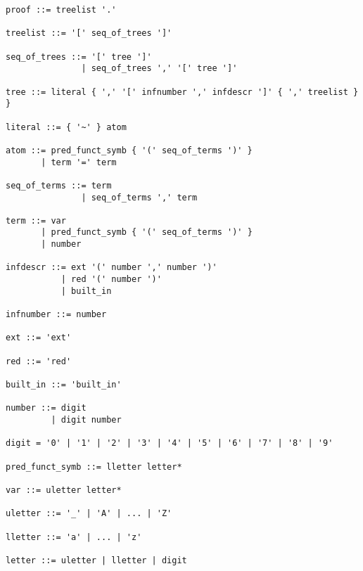 \begin{verbatim}
proof ::= treelist '.'

treelist ::= '[' seq_of_trees ']'

seq_of_trees ::= '[' tree ']'
               | seq_of_trees ',' '[' tree ']'

tree ::= literal { ',' '[' infnumber ',' infdescr ']' { ',' treelist } }

literal ::= { '~' } atom

atom ::= pred_funct_symb { '(' seq_of_terms ')' }
       | term '=' term

seq_of_terms ::= term
               | seq_of_terms ',' term

term ::= var
       | pred_funct_symb { '(' seq_of_terms ')' }
       | number

infdescr ::= ext '(' number ',' number ')'
           | red '(' number ')'
           | built_in

infnumber ::= number

ext ::= 'ext'

red ::= 'red'

built_in ::= 'built_in'

number ::= digit 
         | digit number

digit = '0' | '1' | '2' | '3' | '4' | '5' | '6' | '7' | '8' | '9'

pred_funct_symb ::= lletter letter*

var ::= uletter letter*

uletter ::= '_' | 'A' | ... | 'Z'

lletter ::= 'a' | ... | 'z'

letter ::= uletter | lletter | digit
\end{verbatim}
